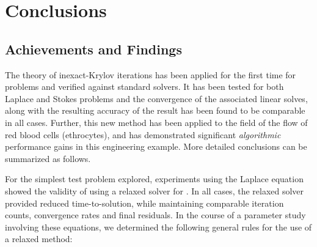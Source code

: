 
\chapter{Conclusions}
\label{chapter:conclusions}
\thispagestyle{myheadings}

\graphicspath{{Conclusions/}}

\section{Achievements and Findings}

The theory of inexact-Krylov iterations has been applied for the first time for {\fmmbem} problems and verified against standard {\gmres} solvers. It has been tested for both Laplace and Stokes problems and the convergence of the associated linear solves, along with the resulting accuracy of the result has been found to be comparable in all cases. Further, this new method has been applied to the field of the flow of red blood cells (ethrocytes), and has demonstrated significant \emph{algorithmic} performance gains in this engineering example. More detailed conclusions can be summarized as follows.

For the simplest test problem explored, experiments using the Laplace equation showed the validity of using a relaxed {\gmres} solver for {\fmmbem}. In all cases, the relaxed solver provided reduced time-to-solution, while maintaining comparable iteration counts, convergence rates and final residuals. In the course of a parameter study involving these equations, we determined the following general rules for the use of a relaxed method:

